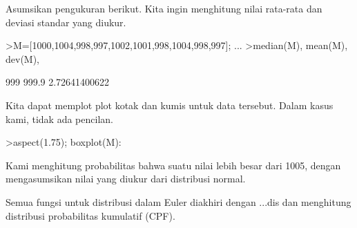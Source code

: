 \documentclass[12pt,arial,letterpaper]{book}
\begin{document}
\begin{eulernootebook}
\begin{eulercomment}
\begin{eulercomment}
\begin{eulernootebook}
\begin{eulercomment}
\begin{eulercomment}
\begin{eulercomment}
\begin{eulercomment}
\begin{eulercomment}
\begin{eulercomment}
\begin{eulercomment}
\begin{eulercomment}
Asumsikan pengukuran berikut. Kita ingin menghitung nilai rata-rata
dan deviasi standar yang diukur.
\end{eulercomment}
\begin{eulerprompt}
>M=[1000,1004,998,997,1002,1001,998,1004,998,997]; ...
>median(M), mean(M), dev(M),
\end{eulerprompt}
\begin{euleroutput}
  999
  999.9
  2.72641400622
\end{euleroutput}
\begin{eulercomment}
Kita dapat memplot plot kotak dan kumis untuk data tersebut. Dalam
kasus kami, tidak ada pencilan.
\end{eulercomment}
\begin{eulerprompt}
>aspect(1.75); boxplot(M):
\end{eulerprompt}
\begin{eulercomment}
Kami menghitung probabilitas bahwa suatu nilai lebih besar dari 1005,
dengan mengasumsikan nilai yang diukur dari distribusi normal.

Semua fungsi untuk distribusi dalam Euler diakhiri dengan ...dis dan
menghitung distribusi probabilitas kumulatif (CPF).


\end{eulercomment}
\end{eulercomment}
\end{eulercomment}
\end{eulercomment}
\end{eulercomment}
\end{eulercomment}
\end{eulercomment}
\end{eulercomment}
\end{eulernootebook}
\end{eulercomment}
\end{eulercomment}
\end{eulernootebook}
\end{document}
